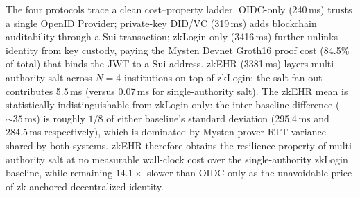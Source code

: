 The four protocols trace a clean cost--property ladder. OIDC-only
(240\,ms) trusts a single OpenID Provider; private-key DID/VC
(319\,ms) adds blockchain auditability through a Sui transaction;
zkLogin-only (3416\,ms) further unlinks identity from key custody,
paying the Mysten Devnet Groth16 proof cost (84.5\% of total)
that binds the JWT to a Sui address. zkEHR (3381\,ms) layers
multi-authority salt across $N\!=\!4$ institutions on top of zkLogin; the
salt fan-out contributes 5.5\,ms (versus 0.07\,ms for
single-authority salt). The zkEHR mean is statistically indistinguishable
from zkLogin-only: the inter-baseline difference ($\sim\!35$\,ms) is
roughly $1/8$ of either baseline's standard deviation
(295.4\,ms and 284.5\,ms respectively), which is dominated by
Mysten prover RTT variance shared by both systems. zkEHR therefore obtains
the resilience property of multi-authority salt at no measurable wall-clock
cost over the single-authority zkLogin baseline, while remaining
$14.1\times$ slower than OIDC-only as the unavoidable price of
zk-anchored decentralized identity.
